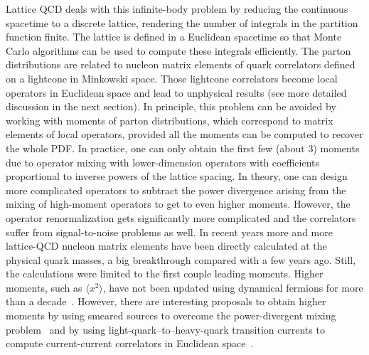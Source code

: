 Lattice QCD deals with this infinite-body problem by reducing the
continuous spacetime to a discrete lattice, rendering the number of integrals in the partition function finite.
The lattice is defined in a Euclidean spacetime so that Monte Carlo
algorithms can be used to compute these integrals efficiently. The parton distributions are related to
nucleon matrix elements of quark correlators defined on a lightcone in
Minkowski space. Those lightcone correlators become local operators in
Euclidean space and lead to unphysical results (see more detailed discussion
in the next section). 
In principle, this problem can be avoided by working with moments of parton
distributions, which correspond to matrix elements of local operators,
provided all the moments can be computed to recover the whole PDF. In
practice, one can only obtain the first few (about 3) moments due to
operator mixing with lower-dimension operators with coefficients proportional
to inverse powers of the lattice spacing.
In theory, one can design more complicated operators to 
subtract the power divergence arising from the mixing of high-moment operators 
to get to even higher moments. 
However, the operator renormalization gets significantly more complicated and 
the correlators suffer from signal-to-noise problems as well. 
In recent years more and more lattice-QCD nucleon matrix elements have been directly 
calculated at the physical quark masses, a big breakthrough compared with 
a few years ago. Still, the calculations were limited to  
the first couple leading moments. Higher moments, such as
$\langle x^2 \rangle$, have not been updated using dynamical fermions for more
than a decade~\cite{Gockeler:2004wp}. 
However, there are interesting proposals to obtain higher moments by using smeared sources to overcome the power-divergent mixing problem~\cite{Davoudi:2012ya} and by using light-quark--to--heavy-quark transition currents to compute current-current correlators in Euclidean space~\cite{Detmold:2005gg}.

